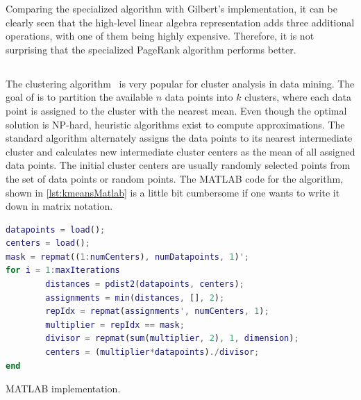 Comparing the specialized algorithm with Gilbert's implementation, it can be clearly seen that the high-level linear algebra representation adds three additional operations, with one of them being highly expensive.
Therefore, it is not surprising that the specialized PageRank algorithm performs better.

\subsection{\kmeans}

The \kmeans clustering algorithm~\cite{macqueen:1967a} is very popular for cluster analysis in data mining.
The goal of \kmeans is to partition the available $n$ data points into $k$ clusters, where each data point is assigned to the cluster with the nearest mean.
Even though the optimal solution is NP-hard, heuristic algorithms exist to compute approximations.
The standard algorithm alternately assigns the data points to its nearest intermediate cluster and calculates new intermediate cluster centers as the mean of all assigned data points.
The initial cluster centers are usually randomly selected points from the set of data points or random points.
The MATLAB code for the \kmeans algorithm, shown in \cref{lst:kmeansMatlab} is a little bit cumbersome if one wants to write it down in matrix notation.

\begin{listing}
	\begin{CenteredBox}
		\begin{lstlisting}[language=Matlab,
		commentstyle=\color{black},
		  stringstyle=\color{black},
		  keywordstyle=\color{black}\bfseries,
		  morekeywords={pdist2, repmat, },]
datapoints = load();
centers = load();
mask = repmat((1:numCenters), numDatapoints, 1)';
for i = 1:maxIterations
		distances = pdist2(datapoints, centers);
		assignments = min(distances, [], 2);
		repIdx = repmat(assignments', numCenters, 1);
		multiplier = repIdx == mask;
		divisor = repmat(sum(multiplier, 2), 1, dimension);
		centers = (multiplier*datapoints)./divisor;
end
		\end{lstlisting}
	\end{CenteredBox}
	\caption{MATLAB \kmeans implementation.}
	\label{lst:kmeansMatlab}
\end{listing}

